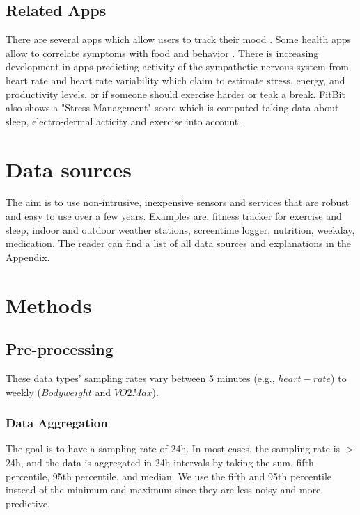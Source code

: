 \documentclass[conference]{IEEEtran}
\begin{document}
\subsection{Related Apps}
\label{sec:apps}

There are several apps which allow users to track their mood  \cite{noauthor_moodprism_nodate}\cite{noauthor_moodily_nodate} \cite{noauthor_moodpanda_nodate}\cite{noauthor_daylio_nodate} \cite{noauthor_mood_nodate}\cite{noauthor_mood_nodate-1}\cite{fitbit_stress_nodate} \cite{appleinc_ios_nodate}\cite{hellocodeinc_exist_nodate}.
Some health apps allow to correlate symptoms with food and behavior \cite{noauthor_pattern_nodate}\cite{noauthor_features_nodate}.
There is increasing development in apps predicting activity of the sympathetic nervous system from heart rate and heart rate variability \cite{welltory_welltory_nodate}\cite{elitehrv_best_nodate} which claim to estimate stress, energy, and productivity levels\cite{welltory_welltory_nodate}, or if someone should exercise harder or teak a break\cite{elitehrv_best_nodate}.
FitBit also shows a "Stress Management" score which is computed taking data about sleep, electro-dermal acticity and exercise into account\cite{fitbit_stress_nodate}.


\section{Data sources}
The aim is to use non-intrusive, inexpensive sensors and services that are robust and easy to use over a few years. 
Examples are, fitness tracker for exercise and sleep, indoor and outdoor weather stations, screentime logger, nutrition, weekday, medication.
The reader can find a list of all data sources and explanations in the Appendix.

\section{Methods}
\subsection{Pre-processing}
These data types' sampling rates vary between 5 minutes (e.g., $heart-rate$) to ~ weekly ($Bodyweight$ and $VO2Max$).

\subsubsection{Data Aggregation}
The goal is to have a sampling rate of 24h.
In most cases, the sampling rate is $>$24h, and the data is aggregated in 24h intervals by taking the sum, fifth percentile, 95th percentile, and median.
We use the fifth and 95th percentile instead of the minimum and maximum since they are less noisy and more predictive.
\end{document}
